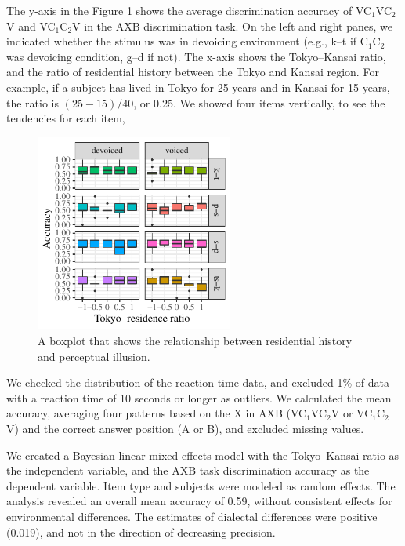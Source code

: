 \documentclass[a4paper,11pt,twocolumn]{article}
\begin{document}
The y-axis in the Figure \ref{fig:axb_results} shows the average discrimination accuracy of VC$_\text{1}$VC$_\text{2}$V and VC$_\text{1}$C$_\text{2}$V in the AXB discrimination task. On the left and right panes, we indicated whether the stimulus was in devoicing environment (e.g., k--t if C$_\text{1}$C$_\text{2}$ was devoicing condition, g--d if not). The x-axis shows the Tokyo--Kansai ratio, and the ratio of residential history between the Tokyo and Kansai region. For example, if a subject has lived in Tokyo for 25 years and in Kansai for 15 years, the ratio is $(25-15)/40$, or $0.25$. We showed four items vertically, to see the tendencies for each item,
\begin{figure}[!ht]
\begin{center}
\includegraphics[width=6.5cm]{../results/artifact/results_axb_allophone.pdf}
\caption{A boxplot that shows the relationship between residential history and perceptual illusion.}\label{fig:axb_results}
\end{center}
\end{figure}

We checked the distribution of the reaction time data, and excluded 1\% of data with a reaction time of 10 seconds or longer as outliers. We calculated the mean accuracy, averaging four patterns based on the X in AXB (VC$_\text{1}$VC$_\text{2}$V or VC$_\text{1}$C$_\text{2}$V) and the correct answer position (A or B), and excluded missing values.

We created a Bayesian linear mixed-effects model \cite{lme4, rstanarm, easystats} with the Tokyo--Kansai ratio as the independent variable, and the AXB task discrimination accuracy as the dependent variable. Item type and subjects were modeled as random effects. The analysis revealed an overall mean accuracy of 0.59, without consistent effects for environmental differences. The estimates of dialectal differences were positive (0.019), and not in the direction of decreasing precision.
\end{document}
